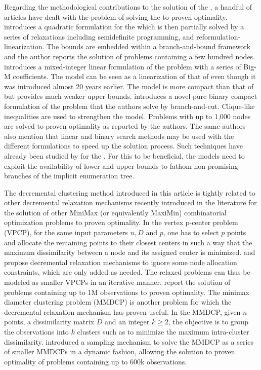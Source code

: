 \documentclass[ijoo,nonblindrev]{informs-ijoo}
\begin{document}
Regarding the methodological contributions to the solution of the \pDP{}, a handful of articles have dealt with the problem of solving the \pDP{} to proven optimality. \citet{Pisinger2006Upper} introduces a quadratic formulation for the \pDP{} which is then partially solved by a series of relaxations including semidefinite programming, and reformulation-linearization. The bounds are embedded within a branch-and-bound framework and the author reports the solution of problems containing a few hundred nodes. \citet{Kuby1987Programming} introduces a mixed-integer linear formulation of the problem with a series of Big-M coefficients. The model can be seen as a linearization of that of \citet{Pisinger2006Upper} even though it was introduced almost 20 years earlier. The model is more compact than that of \citet{Pisinger2006Upper} but provides much weaker upper bounds. \citet{Sayah2017new} introduces a novel pure binary compact formulation of the problem that the authors solve by branch-and-cut. Clique-like inequalities are used to strengthen the model. Problems with up to 1,000 nodes are solved to proven optimality as reported by the authors. The same authors also mention that linear and binary search methods may be used with the different formulations to speed up the solution process. Such techniques have already been studied by \citet{Chandrasekaran1981Location, Pisinger2006Upper} for the \pDP{}. For this to be beneficial, the models need to exploit the availability of lower and upper bounds to fathom non-promising branches of the implicit enumeration tree.

The decremental clustering method introduced in this article is tightly related to other decremental relaxation mechanisms recently introduced in the literature for the solution of other MiniMax (or equivalently MaxiMin) combinatorial optimization problems to proven optimality. In the vertex p-center problem (VPCP), for the same input parameters $n, D$ and $p$, one has to select $p$ points and allocate the remaining points to their closest centers in such a way that the maximum dissimilarity between a node and its assigned center is minimized. \citet{Chen2009New} and \citet{Contardo2019scalable} propose decremental relaxation mechanisms to ignore some node allocation constraints, which are only added as needed. The relaxed problems can thus be modeled as smaller VPCPs in an iterative manner. \citet{Contardo2019scalable} report the solution of problems containing up to 1M observations to proven optimality. The minimax diameter clustering problem (MMDCP) is another problem for which the decremental relaxation mechanism has proven useful. In the MMDCP, given $n$ points, a dissimilarity matrix $D$ and an integer $k\geq 2$, the objective is to group the observations into $k$ clusters such as to minimize the maximum intra-cluster dissimilarity. \citet{Aloise2018sampling} introduced a sampling mechanism to solve the MMDCP as a series of smaller MMDCPs in a dynamic fashion, allowing the solution to proven optimality of problems containing up to 600k observations.
\end{document}
